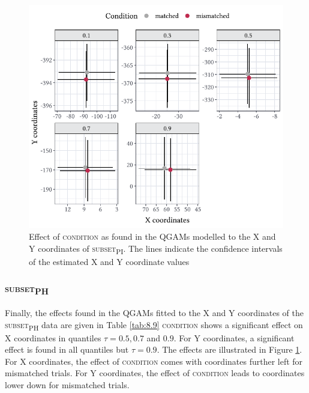 \begin{figure}
    \centering
    \includegraphics[]{figures/fig8.5.pdf}
    \caption{Effect of \textsc{condition} as found in the QGAMs modelled to the X and Y coordinates of \textsc{subset\textsubscript{PI}}. The lines indicate the confidence intervals of the estimated X and Y coordinate values}
    \label{fig:8_5}
\end{figure}

\subsubsection{\textsc{subset\textsubscript{PH}}}\label{section08_2_2_4}

Finally, the effects found in the QGAMs fitted to the X and Y coordinates of the \textsc{subset\textsubscript{PH}} data are given in Table \ref{tab:8.9} \textsc{condition} shows a significant effect on X coordinates in quantiles $\tau=0.5,0.7$ and $0.9$. For Y coordinates, a significant effect is found in all quantiles but $\tau=0.9$. The effects are illustrated in Figure \ref{fig:8_5}. For X coordinates, the effect of \textsc{condition} comes with coordinates further left for mismatched trials. For Y coordinates, the effect of \textsc{condition} leads to coordinates lower down for mismatched trials.

